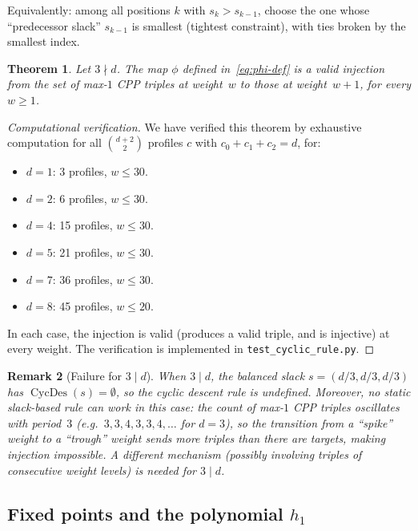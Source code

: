 \documentclass[11pt]{article}
\newtheorem{theorem}{Theorem}
\newtheorem{remark}[theorem]{Remark}
\begin{document}
\noindent
Equivalently: among all positions $k$ with $s_k > s_{k-1}$, choose the one
whose ``predecessor slack'' $s_{k-1}$ is smallest (tightest constraint),
with ties broken by the smallest index.

\begin{theorem}
\label{thm:injection}
Let $3 \nmid d$. The map $\phi$ defined in~\eqref{eq:phi-def} is a valid
injection from the set of max-$1$ CPP triples at weight~$w$ to those at
weight~$w+1$, for every $w \geq 1$.
\end{theorem}

\begin{proof}[Computational verification]
We have verified this theorem by exhaustive computation for all
$\binom{d+2}{2}$ profiles $c$ with $c_0 + c_1 + c_2 = d$, for:
\begin{itemize}
  \item $d = 1$: 3 profiles, $w \leq 30$.
  \item $d = 2$: 6 profiles, $w \leq 30$.
  \item $d = 4$: 15 profiles, $w \leq 30$.
  \item $d = 5$: 21 profiles, $w \leq 30$.
  \item $d = 7$: 36 profiles, $w \leq 30$.
  \item $d = 8$: 45 profiles, $w \leq 20$.
\end{itemize}
In each case, the injection is valid (produces a valid triple, and is injective)
at every weight. The verification is implemented in \texttt{test\_cyclic\_rule.py}.
\end{proof}

\begin{remark}[Failure for $3 \mid d$]
When $3 \mid d$, the balanced slack $s = (d/3, d/3, d/3)$ has
$\operatorname{CycDes}(s) = \emptyset$, so the cyclic descent rule is undefined.
Moreover, no static slack-based rule can work in this case: the count of max-$1$
CPP triples oscillates with period~$3$ (e.g.\ $3, 3, 4, 3, 3, 4, \ldots$
for $d = 3$), so the transition from a ``spike'' weight to a ``trough'' weight
sends more triples than there are targets, making injection impossible.
A different mechanism (possibly involving triples of consecutive weight levels)
is needed for $3 \mid d$.
\end{remark}

\subsection{Fixed points and the polynomial $h_1$}
\end{document}
